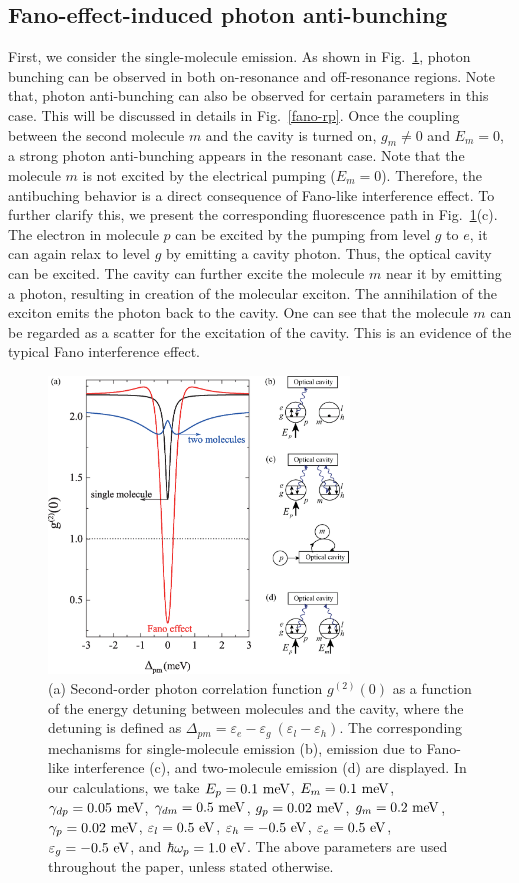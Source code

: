 \documentclass[aps,prb,
,floatfix,footinbib,longbibliography,
preprint
]{revtex4-1}
\begin{document}
\subsection{Fano-effect-induced photon anti-bunching}
 First, we consider the single-molecule emission.
As shown in Fig.~\ref{fano-compare}, photon bunching can be observed in both on-resonance and off-resonance regions. Note that, photon anti-bunching can also be observed for certain parameters in this case. This will be discussed in details in Fig.~\ref{fano-rp}.
Once the coupling between the second molecule $m$ and the cavity is turned on, $g_{m}\neq0$ and $E_{m}=0$, a strong photon anti-bunching appears in the resonant case.
Note that the molecule $m$ is not excited by the electrical pumping ($E_{m}=0$). Therefore, the antibuching behavior is a direct consequence of Fano-like interference effect.
To further clarify this, we present the corresponding fluorescence path in Fig.~\ref{fano-compare}(c). The electron in molecule $p$ can be excited by the pumping from level $g$ to $e$, it can again relax to level $g$ by emitting a cavity photon. Thus, the optical cavity can be excited. The cavity can further excite the molecule $m$ near it by emitting a photon, resulting in creation of the molecular exciton.
The annihilation of the exciton emits the photon back to the cavity. One can see that the molecule $m$ can be regarded as a scatter for the excitation of the cavity. This is an evidence of the typical Fano interference effect\cite{PhysRev.124.1866,RevModPhys.82.2257}.
%
\begin{figure}[h]
\centering
\includegraphics[width=8cm]{fano-compare.eps}
\caption{(a) Second-order photon correlation function $g^{(2)}(0)$ as a function of the energy detuning between molecules and the cavity, where the detuning is defined as $\Delta_{pm}=\varepsilon_{e}-\varepsilon_{g}~(\varepsilon_{l}-\varepsilon_{h})$.
The corresponding mechanisms for single-molecule emission (b), emission due to Fano-like interference (c), and two-molecule emission (d) are displayed. In our calculations,
we take $E_{p}=0.1~{\rm meV}$, $E_{m}=0.1~{\rm meV}$, $\gamma_{dp}=0.05~{\rm meV}$, $\gamma_{dm}=0.5~{\rm meV}$, $g_{p}=0.02~{\rm meV}$, $g_{m}=0.2~{\rm meV}$, $\gamma_{p}=0.02~{\rm meV}$, $\varepsilon_{l}=0.5~{\rm eV}$, $\varepsilon_{h}=-0.5~{\rm eV}$, $\varepsilon_{e}=0.5~{\rm eV}$, $\varepsilon_{g}=-0.5~{\rm eV}$, and $\hbar\omega_{p}=1.0~{\rm eV}$.
The above parameters are used throughout the paper, unless stated otherwise. }
\label{fano-compare}
\end{figure}
\end{document}
